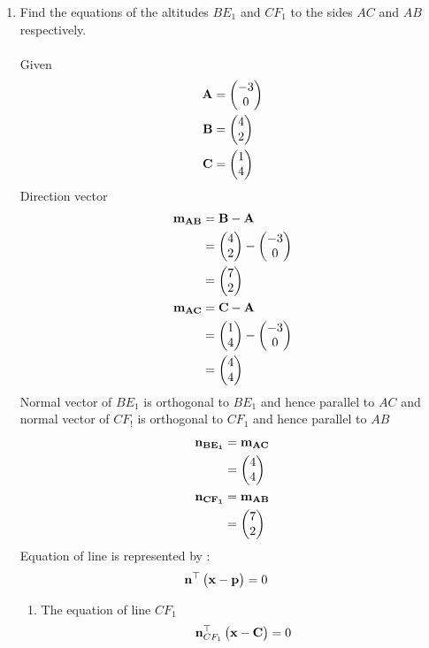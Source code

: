 \documentclass[11pt]{book}
\begin{document}
\begin{enumerate}[label=\thesection.\arabic*.,ref=\thesection.\theenumi]
\item Find the equations of the altitudes $BE_1$ and $CF_1$ to the sides $AC$ and $AB$ respectively. 
  \\    \\ \solution Given 
    \begin{align} 
 \mathbf{A} &= \begin{pmatrix} -3\\ 0 \end{pmatrix} \\ 
 \mathbf{B} &= \begin{pmatrix} 4\\ 2 \end{pmatrix}\\
 \mathbf{C} &= \begin{pmatrix} 1\\ 4\end{pmatrix}
 \end{align}
 Direction vector 
 \begin{align}
     \mathbf{m_{AB}}&=\mathbf{B}-\mathbf{A} \\
           &=\begin{pmatrix}4 \\ 2\end{pmatrix} -\begin{pmatrix}-3 \\ 0\end{pmatrix}  \\
           &=\begin{pmatrix}7 \\2\end{pmatrix} \\
    \mathbf{ m_{AC}}&=\mathbf{C}-\mathbf{A} \\
     &=\begin{pmatrix}1 \\ 4\end{pmatrix} -\begin{pmatrix}-3 \\ 0\end{pmatrix}  \\
     &=\begin{pmatrix}4 \\ 4\end{pmatrix} \\
 \end{align}
  Normal vector of $BE_1$ is orthogonal to $BE_1$  and hence parallel to $AC$ and normal vector of $CF_!$ is orthogonal to $CF_1$ and hence parallel to $AB$
  \begin{align}
      \mathbf{n_{BE_1}}&=\mathbf{m_{AC}}\\
      &=\begin{pmatrix}4 \\ 4\end{pmatrix}\\
      \mathbf{n_{CF_1}}&=\mathbf{m_{AB}}\\
      &=\begin{pmatrix}7 \\ 2\end{pmatrix}\\
  \end{align}
  Equation of line is represented by :
  \begin{align}
      \mathbf{n}^{\top}\begin{pmatrix}\mathbf{x}-\mathbf{p}\end{pmatrix}&=0
  \end{align}
  \begin{enumerate}
      \item The equation of line $CF_1$
      \begin{align}
          \vec{n}^{\top}_{CF_1}\myvec{\vec{x}-\vec{C}}&=0 \\

\end{align}
\end{enumerate}
\end{enumerate}
\end{document}
